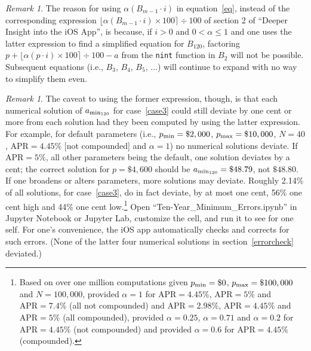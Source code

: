 \documentclass[12pt,letterpaper,oneside]{article}
\theoremstyle{remark} %
\newtheorem{remark}[theorem]{Remark}
\begin{document}
	\newpage
	\begin{remark}
	The reason for using $\alpha\left(B_{m-1}\cdot i\right)$ in equation~\ref{eq}, instead of the corresponding expression $\big\lfloor{\alpha\left(B_{m-1}\cdot i\right)\times 100}\big\rceil\div 100$ of section 2 of ``Deeper Insight into the iOS App'', is because, if $i>0$ and $0<\alpha\leq1$ and one uses the latter expression to find a simplified equation for $B_{120}$, factoring $p+\big\lfloor{\alpha\left(p\cdot i\right)\times 100}\big\rceil\div 100-a$ from the \texttt{nint} function in $B_{2}$ will not be possible. Subsequent equations (i.e., $B_{3}$, $B_{4}$, $B_{5}$, $\dots$) will continue to expand with no way to simplify them even.
	\end{remark}
	
	\vspace{12pt}
	\begin{remark} The caveat to using the former expression, though, is that each numerical solution of $a_{\rm{min_{120}}}$ for case~\ref{case3} could still deviate by one cent or more from each solution had they been computed by using the latter expression. For example, for default parameters (i.e., $p_{\rm{min}}=\$2,000$, $p_{\rm{max}}=\$10,000$, $N=40$, $\mbox{APR}=4.45\%$ [not compounded] and $\alpha =1$) no numerical solutions deviate. If $\mbox{APR}=5\%$, all other parameters being the default, one solution deviates by a cent; the correct solution for $p=\$4,600$ should be $a_{\rm{min_{120}}}=\$48.79$, not $\$48.80$. If one broadens or alters parameters, more solutions may deviate. Roughly 2.14\% of all solutions, for case~\ref{case3}, do in fact deviate, by at most one cent, 56\% one cent high and 44\% one cent low.\footnote{Based on over one million computations given $p_{\rm{min}}=\$0$, $p_{\rm{max}}=\$100,000$ and $N=100,000$, provided $\alpha =1$ for $\mbox{APR}=4.45\%$, $\mbox{APR}=5\%$ and $\mbox{APR}=7.4\%$ (all not compounded) and $\mbox{APR}=2.98\%$, $\mbox{APR}=4.45\%$ and $\mbox{APR}=5\%$ (all compounded), provided $\alpha =0.25$, $\alpha =0.71$ and $\alpha =0.2$ for $\mbox{APR}=4.45\%$ (not compounded) and provided $\alpha =0.6$ for $\mbox{APR}=4.45\%$ (compounded).} Open ``Ten-Year\_Minimum\_Errors.ipynb'' in Jupyter Notebook or Jupyter Lab, customize the cell, and run it to see for one self. For one's convenience, the iOS app automatically checks and corrects for such errors. (None of the latter four numerical solutions in section~\ref{errorcheck} deviated.)
	\end{remark}	
\end{document}
